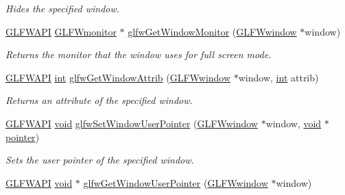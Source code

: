 \begin{DoxyCompactItemize}
\begin{DoxyCompactList}\small\item\em Hides the specified window. \end{DoxyCompactList}\item 
\hyperlink{glfw3_8h_a56da5036b2cc259351ae22fd6439bb47}{G\-L\-F\-W\-A\-P\-I} \hyperlink{group__monitor_ga8d9efd1cde9426692c73fe40437d0ae3}{G\-L\-F\-Wmonitor} $\ast$ \hyperlink{group__window_gaf1525cb3bccd5789c702cc9676ef3403}{glfw\-Get\-Window\-Monitor} (\hyperlink{group__window_ga3c96d80d363e67d13a41b5d1821f3242}{G\-L\-F\-Wwindow} $\ast$window)
\begin{DoxyCompactList}\small\item\em Returns the monitor that the window uses for full screen mode. \end{DoxyCompactList}\item 
\hyperlink{glfw3_8h_a56da5036b2cc259351ae22fd6439bb47}{G\-L\-F\-W\-A\-P\-I} \hyperlink{wglew_8h_a500a82aecba06f4550f6849b8099ca21}{int} \hyperlink{group__window_ga1bb0c7e100418e284dbb800789c63d40}{glfw\-Get\-Window\-Attrib} (\hyperlink{group__window_ga3c96d80d363e67d13a41b5d1821f3242}{G\-L\-F\-Wwindow} $\ast$window, \hyperlink{wglew_8h_a500a82aecba06f4550f6849b8099ca21}{int} attrib)
\begin{DoxyCompactList}\small\item\em Returns an attribute of the specified window. \end{DoxyCompactList}\item 
\hyperlink{glfw3_8h_a56da5036b2cc259351ae22fd6439bb47}{G\-L\-F\-W\-A\-P\-I} \hyperlink{wglew_8h_aeea6e3dfae3acf232096f57d2d57f084}{void} \hyperlink{group__window_gacc9e68faee3c1763b54cd9bc405cf43e}{glfw\-Set\-Window\-User\-Pointer} (\hyperlink{group__window_ga3c96d80d363e67d13a41b5d1821f3242}{G\-L\-F\-Wwindow} $\ast$window, \hyperlink{wglew_8h_aeea6e3dfae3acf232096f57d2d57f084}{void} $\ast$\hyperlink{glew_8h_ae55c7660a19efe8abc738283ea88fb58}{pointer})
\begin{DoxyCompactList}\small\item\em Sets the user pointer of the specified window. \end{DoxyCompactList}\item 
\hyperlink{glfw3_8h_a56da5036b2cc259351ae22fd6439bb47}{G\-L\-F\-W\-A\-P\-I} \hyperlink{wglew_8h_aeea6e3dfae3acf232096f57d2d57f084}{void} $\ast$ \hyperlink{group__window_ga0a9ff3b4bf8589e9518e8816d06a8f50}{glfw\-Get\-Window\-User\-Pointer} (\hyperlink{group__window_ga3c96d80d363e67d13a41b5d1821f3242}{G\-L\-F\-Wwindow} $\ast$window)

\end{DoxyCompactItemize}
